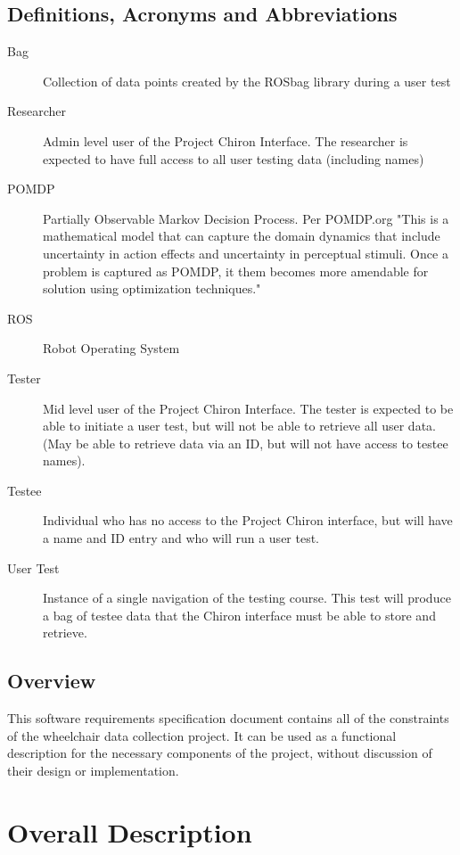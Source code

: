 \documentclass[onecolumn, draftclsnofoot,10pt, compsoc]{IEEEtran}
\begin{document}
\subsection{Definitions, Acronyms and Abbreviations}
\begin{description}
\item [Bag] \hfill \break Collection of data points created by the ROSbag library during a user test
\item [Researcher] \hfill \break Admin level user of the Project Chiron Interface. The researcher is expected to have full access to all user testing data (including names)
\item [POMDP] \hfill \break Partially Observable Markov Decision Process. Per POMDP.org "This is a mathematical model that can capture the domain dynamics that include uncertainty in action effects and uncertainty in perceptual stimuli. Once a problem is captured as POMDP, it them becomes more amendable for solution using optimization techniques." \cite{1}
\item [ROS] \hfill \break Robot Operating System
\item [Tester] \hfil \break Mid level user of the Project Chiron Interface. The tester is expected to be able to initiate a user test, but will not be able to retrieve all user data. (May be able to retrieve data via an ID, but will not have access to testee names).
\item [Testee] \hfill \break Individual who has no access to the Project Chiron interface, but will have a name and ID entry and who will run a user test.
\item [User Test] \hfill \break Instance of a single navigation of the testing course. This test will produce a bag of testee data that the Chiron interface must be able to store and retrieve.
\end{description}

\subsection{Overview}
This software requirements specification document contains all of the constraints of the wheelchair data collection project. It can be used as a functional description for the necessary components of the project, without discussion of their design or implementation.


\section{Overall Description}
\end{document}
